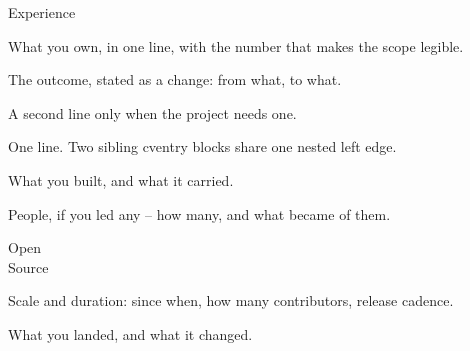 \documentclass[fontset=commercial,pagefooter=false]{yuan2resume}
\begin{document}
\maketitle

\begin{cvtwocolumn}

\begin{cvsection}{Experience}
  \begin{cvitemize}
    \item What you own, in one line, with the number that makes the scope legible.
  \end{cvitemize}
  \begin{cventry}
    \begin{cvitemize}
      \item The outcome, stated as a change: from what, to what.
      \item A second line only when the project needs one.
    \end{cvitemize}
  \end{cventry}
  \begin{cventry}
    \begin{cvitemize}
      \item One line. Two sibling cventry blocks share one nested left edge.
    \end{cvitemize}
  \end{cventry}
  \cvgap
  \begin{cvitemize}
    \item What you built, and what it carried.
    \item People, if you led any -- how many, and what became of them.
  \end{cvitemize}
\end{cvsection}

\begin{cvsection}{Open\\Source}
  \begin{cvitemize}
    \item Scale and duration: since when, how many contributors, release cadence.
  \end{cvitemize}
  \cvgap
  \begin{cvitemize}
    \item What you landed, and what it changed.
  \end{cvitemize}
\end{cvsection}


\end{cvtwocolumn}
\end{document}
